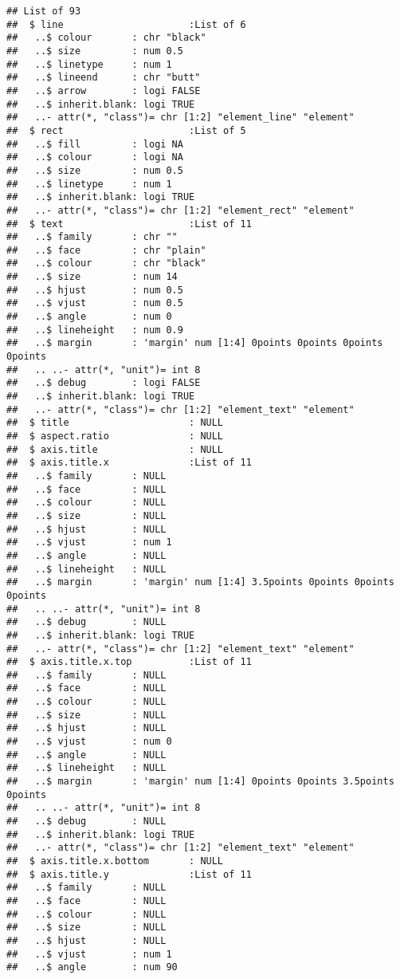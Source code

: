\documentclass[
]{article}
\begin{document}
\begin{verbatim}
## List of 93
##  $ line                      :List of 6
##   ..$ colour       : chr "black"
##   ..$ size         : num 0.5
##   ..$ linetype     : num 1
##   ..$ lineend      : chr "butt"
##   ..$ arrow        : logi FALSE
##   ..$ inherit.blank: logi TRUE
##   ..- attr(*, "class")= chr [1:2] "element_line" "element"
##  $ rect                      :List of 5
##   ..$ fill         : logi NA
##   ..$ colour       : logi NA
##   ..$ size         : num 0.5
##   ..$ linetype     : num 1
##   ..$ inherit.blank: logi TRUE
##   ..- attr(*, "class")= chr [1:2] "element_rect" "element"
##  $ text                      :List of 11
##   ..$ family       : chr ""
##   ..$ face         : chr "plain"
##   ..$ colour       : chr "black"
##   ..$ size         : num 14
##   ..$ hjust        : num 0.5
##   ..$ vjust        : num 0.5
##   ..$ angle        : num 0
##   ..$ lineheight   : num 0.9
##   ..$ margin       : 'margin' num [1:4] 0points 0points 0points 0points
##   .. ..- attr(*, "unit")= int 8
##   ..$ debug        : logi FALSE
##   ..$ inherit.blank: logi TRUE
##   ..- attr(*, "class")= chr [1:2] "element_text" "element"
##  $ title                     : NULL
##  $ aspect.ratio              : NULL
##  $ axis.title                : NULL
##  $ axis.title.x              :List of 11
##   ..$ family       : NULL
##   ..$ face         : NULL
##   ..$ colour       : NULL
##   ..$ size         : NULL
##   ..$ hjust        : NULL
##   ..$ vjust        : num 1
##   ..$ angle        : NULL
##   ..$ lineheight   : NULL
##   ..$ margin       : 'margin' num [1:4] 3.5points 0points 0points 0points
##   .. ..- attr(*, "unit")= int 8
##   ..$ debug        : NULL
##   ..$ inherit.blank: logi TRUE
##   ..- attr(*, "class")= chr [1:2] "element_text" "element"
##  $ axis.title.x.top          :List of 11
##   ..$ family       : NULL
##   ..$ face         : NULL
##   ..$ colour       : NULL
##   ..$ size         : NULL
##   ..$ hjust        : NULL
##   ..$ vjust        : num 0
##   ..$ angle        : NULL
##   ..$ lineheight   : NULL
##   ..$ margin       : 'margin' num [1:4] 0points 0points 3.5points 0points
##   .. ..- attr(*, "unit")= int 8
##   ..$ debug        : NULL
##   ..$ inherit.blank: logi TRUE
##   ..- attr(*, "class")= chr [1:2] "element_text" "element"
##  $ axis.title.x.bottom       : NULL
##  $ axis.title.y              :List of 11
##   ..$ family       : NULL
##   ..$ face         : NULL
##   ..$ colour       : NULL
##   ..$ size         : NULL
##   ..$ hjust        : NULL
##   ..$ vjust        : num 1
##   ..$ angle        : num 90

\end{verbatim}
\end{document}
